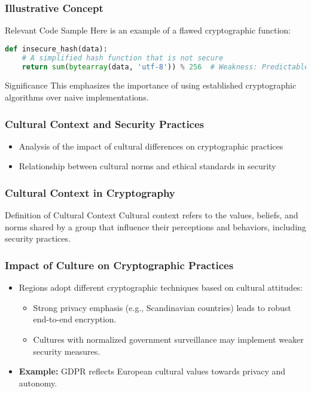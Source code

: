 \documentclass{beamer}
\begin{document}
\begin{frame}[fragile]
    \frametitle{Illustrative Concept}

    \begin{block}{Relevant Code Sample}
        Here is an example of a flawed cryptographic function:
    \end{block}
    
    \begin{lstlisting}[language=Python]
def insecure_hash(data):
    # A simplified hash function that is not secure
    return sum(bytearray(data, 'utf-8')) % 256  # Weakness: Predictable output
    \end{lstlisting}

    \begin{block}{Significance}
        This emphasizes the importance of using established cryptographic algorithms over naive implementations.
    \end{block}
\end{frame}

\begin{frame}[fragile]
    \frametitle{Cultural Context and Security Practices}
    \begin{itemize}
        \item Analysis of the impact of cultural differences on cryptographic practices
        \item Relationship between cultural norms and ethical standards in security
    \end{itemize}
\end{frame}

\begin{frame}[fragile]
    \frametitle{Cultural Context in Cryptography}
    \begin{block}{Definition of Cultural Context}
        Cultural context refers to the values, beliefs, and norms shared by a group that influence their perceptions and behaviors, including security practices.
    \end{block}
\end{frame}

\begin{frame}[fragile]
    \frametitle{Impact of Culture on Cryptographic Practices}
    \begin{itemize}
        \item Regions adopt different cryptographic techniques based on cultural attitudes:
        \begin{itemize}
            \item Strong privacy emphasis (e.g., Scandinavian countries) leads to robust end-to-end encryption.
            \item Cultures with normalized government surveillance may implement weaker security measures.
        \end{itemize}
        \item \textbf{Example:} GDPR reflects European cultural values towards privacy and autonomy.
    \end{itemize}
\end{frame}
\end{document}
